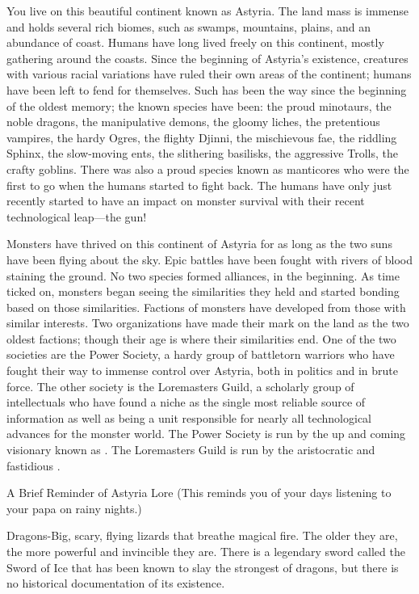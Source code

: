 \documentclass[blue]{guildcamp2}
\begin{document}
\name{\bAstyria{}}

You live on this beautiful continent known as Astyria. The land mass is immense and holds several rich biomes, such as swamps, mountains, plains, and an abundance of coast. Humans have long lived freely on this continent, mostly gathering around the coasts. Since the beginning of Astyria's existence, creatures with various racial variations have ruled their own areas of the continent; humans have been left to fend for themselves. Such has been the way since the beginning of the oldest memory; the known species have been: the proud minotaurs, the noble dragons, the manipulative demons, the gloomy liches, the pretentious vampires, the hardy Ogres, the flighty Djinni, the mischievous fae, the riddling Sphinx, the slow-moving ents, the slithering basilisks, the aggressive Trolls, the crafty goblins. There was also a proud species known as manticores who were the first to go when the humans started to fight back. The humans have only just recently started to have an impact on monster survival with their recent technological leap---the gun!

Monsters have thrived on this continent of Astyria for as long as the two suns have been flying about the sky. Epic battles have been fought with rivers of blood staining the ground. No two species formed alliances, in the beginning. As time ticked on, monsters began seeing the similarities they held and started bonding based on those similarities. Factions of monsters have developed from those with similar interests. Two organizations have made their mark on the land as the two oldest factions; though their age is where their similarities end. One of the two societies are the Power Society, a hardy group of battletorn warriors who have fought their way to immense control over Astyria, both in politics and in brute force. The other society is the Loremasters Guild, a scholarly group of intellectuals who have found a niche as the single most reliable source of information as well as being a unit responsible for nearly all technological advances for the monster world. The Power Society is run by the up and coming visionary known as \cRed{}. The Loremasters Guild is run by the aristocratic and fastidious \cVampire{}.

A Brief Reminder of Astyria Lore (This reminds you of your days listening to your papa on rainy nights.)

Dragons-Big, scary, flying lizards that breathe magical fire. The older they are, the more powerful and invincible they are. There is a legendary sword called the Sword of Ice that has been known to slay the strongest of dragons, but there is no historical documentation of its existence.
\end{document}
